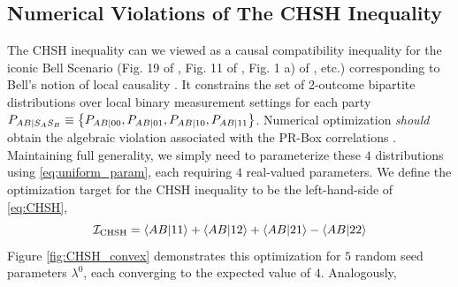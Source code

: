 \documentclass[aps, 10pt, english, twoside, pra, nofootinbib, longbibliography]{revtex4-1}
\theoremstyle{plain}
\theoremstyle{definition}
\theoremstyle{remark}
\begin{document}
    \subsection{Numerical Violations of The CHSH Inequality}
    The CHSH inequality \cite{CHSH_Original} can we viewed as a causal compatibility inequality for the iconic Bell Scenario (Fig. 19 of \cite{Wood_2012}, Fig. 11 of \cite{Inflation}, Fig. 1 a) of \cite{Tavakoli_2015}, etc.) corresponding to Bell's notion of local causality \cite{Wood_2012}. It constrains the set of 2-outcome bipartite distributions over local binary measurement settings for each party $\prob[AB\mid S_A S_B] \defined \bc{\prob[AB\mid 0 0], \prob[AB\mid 01], \prob[AB\mid 10], \prob[AB\mid 11]}$. Numerical optimization \textit{should} obtain the algebraic violation associated with the PR-Box correlations \cite{PR_1995}. Maintaining full generality, we simply need to parameterize these $4$ distributions using \cref{eq:uniform_param}, each requiring $4$ real-valued parameters. We define the optimization target for the CHSH inequality to be the left-hand-side of \cref{eq:CHSH},
    \[ \mathcal{I}\tsb{CHSH} = \ba{AB|11} + \ba{AB|12} + \ba{AB|21} - \ba{AB|22} \]
    Figure \ref{fig:CHSH_convex} demonstrates this optimization for $5$ random seed parameters $\lambda^0$, each converging to the expected value of $4$. Analogously, \cite{Cirelson_1980}
\end{document}

